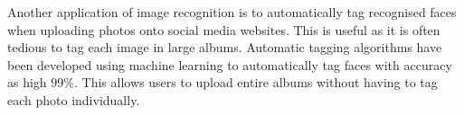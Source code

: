 Another application of image recognition is to automatically tag recognised faces when uploading photos onto social media websites. This is useful as it is often tedious to tag each image in large albums. Automatic tagging algorithms have been developed using machine learning to automatically tag faces with accuracy as high $99\%$\cite{schroff2015facenet}. This allows users to upload entire albums without having to tag each photo individually.
